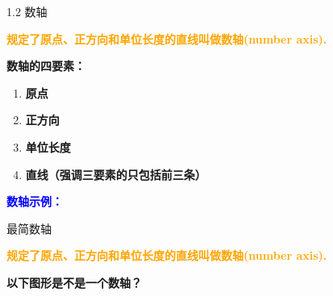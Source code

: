 \begin{frame}{1.2 数轴}
\begin{definition}
\textbf{\textcolor{orange}{规定了原点、正方向和单位长度的直线叫做数轴(number axis).} } \\
\end{definition}
\vspace{12pt}
\textbf{数轴的四要素：} 
\begin{enumerate}[label={\arabic*.}]
    \item \textbf{原点}
    \item \textbf{正方向}
    \item \textbf{单位长度}
    \item \textbf{直线（强调三要素的只包括前三条）}
\end{enumerate}
\vspace{12pt}
\textbf{\textcolor{blue} {数轴示例：}}
\vspace{12pt}
\begin{figure}
\end{figure}
\end{frame}

\begin{frame}{最简数轴}
\begin{definition}
\textbf{\textcolor{orange}{规定了原点、正方向和单位长度的直线叫做数轴(number axis).} } \\
\end{definition}
\vspace{12pt}
\vspace{1cm}
\textbf{以下图形是不是一个数轴？}
\vspace{1cm}
\begin{figure}
\end{figure}
\end{frame}


